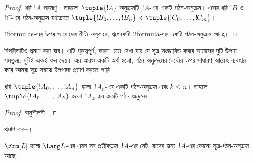 \documentclass[../../../include/open-logic-section]{subfiles}
\begin{document}
\begin{proof}
ধরি $!A$ পরমাণু। তাহলে~$\tuple{!A}$ অনুক্রমটি~$!A$-এর একটি
গঠন-অনুক্রম।
%
এবার ধরি $!B$ ও~$!C$-এর গঠন-অনুক্রম যথাক্রমে
$\tuple{!B_0,\dotsc,!B_n}$ ও $\tuple{!C_0,\dotsc,!C_m}$।
%
\begin{enumerate}
\end{enumerate}
!!{formula}s-এর উপর আরোহের নীতি অনুসারে, প্রত্যেকটি !!{formula}-এর
একটি গঠন-অনুক্রম আছে।
\end{proof}

বিপরীতটিও প্রমাণ করা যায়। এটি গুরুত্বপূর্ণ, কারণ এতে দেখা যায় যে
সূত্র সংজ্ঞায়িত করার আমাদের দুটি উপায় সমতুল্য: দুটিই একই ফল দেয়।
এর আরও একটি অর্থ হলো, গঠন-অনুক্রমের দৈর্ঘ্যের উপর সাধারণ আরোহ ব্যবহার
করে আমরা সূত্র সম্বন্ধে উপপাদ্য প্রমাণ করতে পারি।

\begin{lem}
ধরি $\tuple{!A_0,\dotsc,!A_n}$ হলো~$!A_n$-এর একটি গঠন-অনুক্রম এবং
$k \leq n$। তাহলে $\tuple{!A_0,\dotsc,!A_k}$ হলো~$!A_k$-এর একটি
গঠন-অনুক্রম।
\end{lem}

\begin{proof}
অনুশীলনী।
\end{proof}

\begin{prob}
 প্রমাণ করুন।
\end{prob}

\begin{thm}
$\Frm[L]$ হলো $\Lang L$-এর এমন সব প্রতীকক্রম~$!A$-এর সেট,
যাদের জন্য~$!A$-এর কোনো সূত্র-গঠন-অনুক্রম আছে।
\end{thm}
\end{document}
